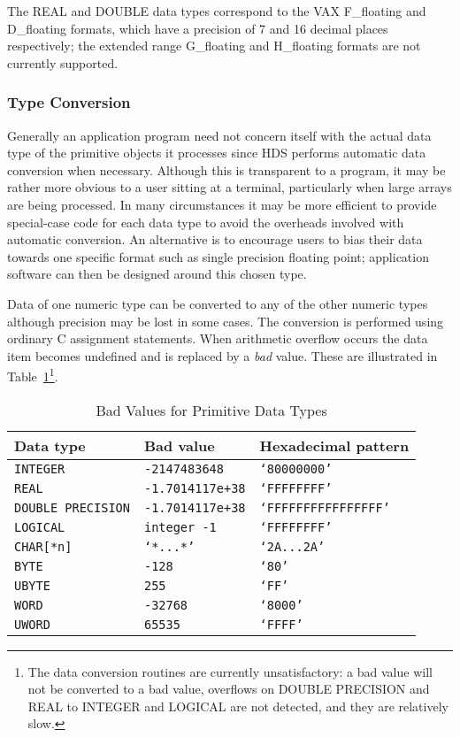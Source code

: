 The REAL and DOUBLE data types correspond to the VAX F\_floating and
D\_floating formats, which have a precision of 7 and 16 decimal places
respectively; the extended range G\_floating and H\_floating formats are
not currently supported.

\subsubsection {Type Conversion}

Generally an application program need not concern itself with the actual data
type of the primitive objects it processes since HDS performs automatic data
conversion when necessary. Although this is transparent to a program, it may be
rather more obvious to a user sitting at a terminal, particularly when large
arrays are being processed. In many circumstances it may be more efficient to
provide special-case code for each data type to avoid the overheads involved
with automatic conversion. An alternative is to encourage users to bias their
data towards one specific format such as single precision floating point;
application software can then be designed around this chosen type.

Data of one numeric type can be converted to any of the other numeric types
although precision may be lost in some cases. The conversion is performed using
ordinary C assignment statements. When arithmetic overflow occurs the data item
becomes undefined and is replaced by a {\em bad} value. These are illustrated
in Table~\ref{bad_values_for_primitive_data_types}\footnote{The data conversion
routines are currently unsatisfactory: a bad value will not be converted to a
bad value, overflows on DOUBLE PRECISION and REAL to INTEGER and LOGICAL are
not detected, and they are relatively slow.}.

\begin {table}[htbp]
\begin {center}
\begin {tabular}{||l|l|l||}
\hline
Data type		& Bad value		& Hexadecimal pattern \\
\hline
{\tt INTEGER}		& {\tt -2147483648}	& {\tt `80000000'} \\
{\tt REAL}		& {\tt -1.7014117e+38}	& {\tt `FFFFFFFF'} \\
{\tt DOUBLE PRECISION}	& {\tt -1.7014117e+38}	& {\tt `FFFFFFFFFFFFFFFF'} \\
{\tt LOGICAL}		& {\tt integer -1}	& {\tt `FFFFFFFF'} \\
{\tt CHAR[*n]}		& {\tt `*...*'}		& {\tt `2A...2A'} \\
{\tt BYTE}		& {\tt -128}		& {\tt `80'} \\
{\tt UBYTE}		& {\tt 255}		& {\tt `FF'} \\
{\tt WORD}		& {\tt -32768}		& {\tt `8000'} \\
{\tt UWORD}		& {\tt 65535}		& {\tt `FFFF'} \\
\hline
\end {tabular}
\caption {Bad Values for Primitive Data Types}
\label {bad_values_for_primitive_data_types}
\end {center}
\end {table}

